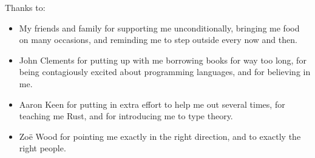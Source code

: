 \noindent
Thanks to:
\begin{itemize}
    \item My friends and family for supporting me unconditionally, bringing me food on many occasions, and reminding me to step outside every now and then.
    \item John Clements for putting up with me borrowing books for way too long, for being contagiously excited about programming languages, and for believing in me.
    \item Aaron Keen for putting in extra effort to help me out several times, for teaching me Rust, and for introducing me to type theory.
    \item Zo\"e Wood for pointing me exactly in the right direction, and to exactly the right people.
\end{itemize}
